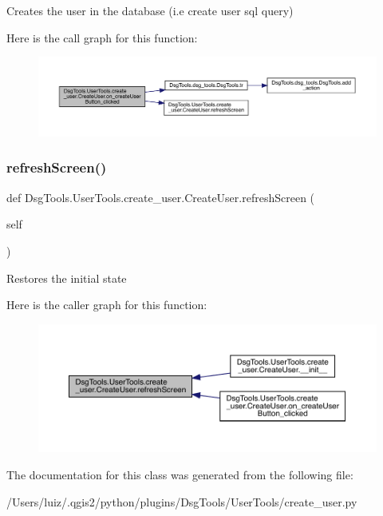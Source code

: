 \begin{DoxyVerb}Creates the user in the database (i.e create user sql query)
\end{DoxyVerb}
 Here is the call graph for this function\+:
\nopagebreak
\begin{figure}[H]
\begin{center}
\leavevmode
\includegraphics[width=350pt]{class_dsg_tools_1_1_user_tools_1_1create__user_1_1_create_user_a5814b4fb14668666b538a934fd7f1ada_cgraph}
\end{center}
\end{figure}
\mbox{\label{class_dsg_tools_1_1_user_tools_1_1create__user_1_1_create_user_ac66430f2c2cb2d036c4eda919bb2cca0}} 
\subsubsection{\texorpdfstring{refresh\+Screen()}{refreshScreen()}}
{\footnotesize\ttfamily def Dsg\+Tools.\+User\+Tools.\+create\+\_\+user.\+Create\+User.\+refresh\+Screen (\begin{DoxyParamCaption}\item[{}]{self }\end{DoxyParamCaption})}

\begin{DoxyVerb}Restores the initial state
\end{DoxyVerb}
 Here is the caller graph for this function\+:
\nopagebreak
\begin{figure}[H]
\begin{center}
\leavevmode
\includegraphics[width=350pt]{class_dsg_tools_1_1_user_tools_1_1create__user_1_1_create_user_ac66430f2c2cb2d036c4eda919bb2cca0_icgraph}
\end{center}
\end{figure}


The documentation for this class was generated from the following file\+:\begin{DoxyCompactItemize}
\item 
/\+Users/luiz/.\+qgis2/python/plugins/\+Dsg\+Tools/\+User\+Tools/create\+\_\+user.\+py\end{DoxyCompactItemize}
